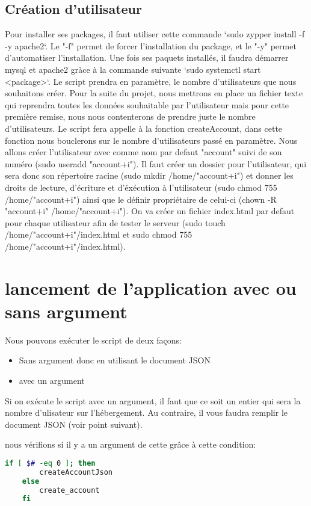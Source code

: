 \documentclass{article}
\begin{document}
	\subsection{Création d'utilisateur}
	Pour installer ses packages, il faut utiliser cette commande `sudo zypper install -f -y apache2`. Le "-f" permet de forcer l'installation du package, et le "-y" permet d'automatiser l'installation. Une fois ses paquets installés, il faudra démarrer mysql et apache2 gràce à la commande suivante `sudo systemctl start <package>`. Le script prendra en paramètre, le nombre d'utilisateurs que nous souhaitons créer. Pour la suite du projet, nous mettrons en place un fichier texte qui reprendra toutes les données souhaitable par l'utilisateur mais pour cette première remise, nous nous contenterons de prendre juste le nombre d'utilisateurs. Le script fera appelle à la fonction createAccount, dans cette fonction nous bouclerons sur le nombre d'utilisateurs passé en paramètre. Nous allons créer l'utilisateur avec comme nom par defaut "account" suivi de son numéro (sudo useradd "account+i"). Il faut créer un dossier pour l'utilisateur, qui sera donc son répertoire racine (sudo mkdir /home/"account+i") et donner les droits de lecture, d'écriture et d'éxécution à l'utilisateur (sudo chmod 755 /home/"account+i") ainsi que le définir propriétaire de celui-ci (chown -R "account+i" /home/"account+i").
	On va créer un fichier index.html par defaut pour chaque utilisateur afin de tester le serveur (sudo touch /home/"account+i"/index.html et sudo chmod 755 /home/"account+i"/index.html).

\section{lancement de l'application avec ou sans argument}

	Nous pouvons exécuter le script de deux façons:
	\begin{itemize}
		\item Sans argument donc en utilisant le document JSON
		\item avec un argument
	\end{itemize}

	Si on exécute le script avec un argument, il faut que ce soit un entier qui sera la nombre d'ulisateur sur l'hébergement.
	Au contraire, il vous faudra remplir le document JSON (voir point suivant).

	nous vérifions si il y a un argument de cette grâce à cette condition:
	\begin{lstlisting}[language=bash]
	if [ $# -eq 0 ]; then
		createAccountJson
	else
		create_account
	fi
	\end{lstlisting}
\end{document}

